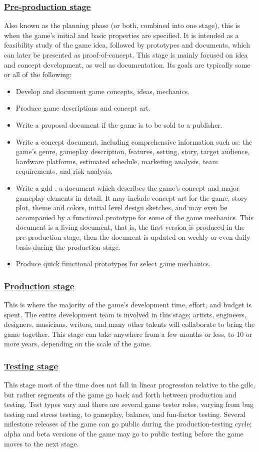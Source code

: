 \documentclass[../main.tex]{subfiles}
\begin{document}
\subsubsection*{\underline{Pre-production stage}}
Also known as the planning phase (or both, combined into one stage), this is when the game’s initial and basic properties are specified. It is intended as a feasibility study of the game idea, followed by prototypes and documents, which can later be presented as proof-of-concept. This stage is mainly focused on idea and concept development, as well as documentation. Its goals are typically some or all of the following:
\begin{itemize}
    \item Develop and document game concepts, ideas, mechanics.
    \item Produce game descriptions and concept art.
    \item Write a proposal document if the game is to be sold to a publisher.
    \item Write a concept document, including comprehensive information such as:  the game's genre, gameplay description, features, setting, story, target audience, hardware platforms, estimated schedule, marketing analysis, team requirements, and risk analysis.
    \item Write a \acrfull{gdd} , a document which describes the game’s concept and major gameplay elements in detail. It may include concept art for the game, story plot, theme and colors, initial level design sketches, and may even be accompanied by a functional prototype for some of the game mechanics. This document is a living document, that is, the first version is produced in the pre-production stage, then the document is updated on weekly or even daily-basis during the production stage.
    \item Produce quick functional prototypes for select game mechanics.
\end{itemize}
\subsubsection*{\underline{Production stage}}
This is where the majority of the game’s development time, effort, and budget is spent. The entire development team is involved in this stage; artists, engineers, designers, musicians, writers, and many other talents will collaborate to bring the game together. This stage can take anywhere from a few months or less, to 10 or more years, depending on the scale of the game.
\subsubsection*{\underline{Testing stage}}
This stage most of the time does not fall in linear progression relative to the \acrshort{gdlc}, but rather segments of the game go back and forth between production and testing. Test types vary and there are several game tester roles, varying from bug testing and stress testing, to gameplay, balance, and fun-factor testing. Several milestone releases of the game can go public during the production-testing cycle; alpha and beta versions of the game may go to public testing before the game moves to the next stage.
\end{document}
